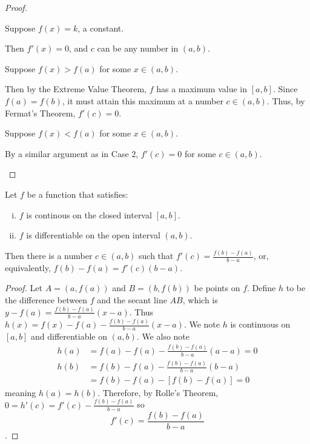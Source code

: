 \documentclass[a4paper,8pt]{article}
\begin{document}
\begin{outline}
    \begin{proof}
      \begin{proofcases}
        \item
          Suppose \(f(x) = k\), a constant.

          Then \(f'(x) = 0\), and \(c\) can be any number in \((a, b)\).
        \item
          Suppose \(f(x) > f(a)\) for some \(x \in (a, b)\).

          Then by the Extreme Value Theorem, \(f\) has a
          maximum value in \([a, b]\). Since \(f(a)=f(b)\), it must attain this maximum at a number \(c \in (a, b)\).
          Thus, by Fermat's Theorem, \(f'(c) = 0\).
        \item
          Suppose \(f(x) < f(a)\) for some \(x \in (a, b)\).

          By a similar argument as in Case 2, \(f'(c) = 0\) for some \(c \in (a, b)\).
      \end{proofcases}
    \end{proof}

  \pagebreak
    Let \(f\) be a function that satisfies:
    \begin{enumerate}[i.]
      \item \(f\) is continous on the closed interval \([a, b]\).
      \item \(f\) is differentiable on the open interval \((a, b)\).
    \end{enumerate}
    Then there is a number \(c \in (a, b)\) such that \(f'(c) = \frac{f(b)-f(a)}{b-a}\), or, equivalently,
    \(f(b)-f(a) = f'(c)(b-a)\).

    \begin{proof}
      Let \(A = (a, f(a))\) and \(B = (b, f(b))\) be points on \(f\). Define \(h\) to be the difference between
      \(f\) and the secant line \(AB\), which is \(y - f(a) = \frac{f(b)-f(a)}{b-a}(x-a)\). Thus \(h(x) =
      f(x)-f(a)-\frac{f(b)-f(a)}{b-a}(x-a)\). We note \(h\) is continuous on \([a, b]\) and differentiable on
      \((a, b)\). We also note
      \begin{align*}
        h(a) &= f(a)-f(a)-\frac{f(b)-f(a)}{b-a}(a-a) = 0\\
        h(b) &= f(b)-f(a)-\frac{f(b)-f(a)}{b-a}(b-a)\\
             &= f(b)-f(a)-[f(b)-f(a)] = 0
      \end{align*}
      meaning \(h(a)=h(b)\). Therefore, by Rolle's Theorem, \(0 = h'(c) = f'(c) -
      \frac{f(b)-f(a)}{b-a}\) so \[f'(c) = \frac{f(b)-f(a)}{b-a}\].
    \end{proof}


\end{outline}
\end{document}
